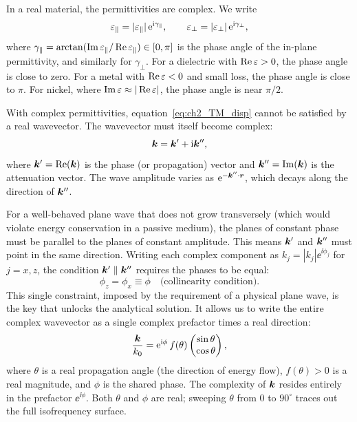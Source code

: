 In a real material, the permittivities are complex. We write
\begin{equation}
  \varepsilon_{\parallel} = |\varepsilon_{\parallel}|\,\mathrm{e}^{\mathrm{i}\gamma_\parallel}, \qquad
  \varepsilon_{\perp} = |\varepsilon_{\perp}|\,\mathrm{e}^{\mathrm{i}\gamma_\perp},
  \label{eq:ch2_polar_eps}
\end{equation}
where $\gamma_\parallel = \arctan(\operatorname{Im}\varepsilon_{\parallel}/\operatorname{Re}\varepsilon_{\parallel}) \in [0,\pi]$ is the
phase angle of the in-plane permittivity, and similarly for $\gamma_\perp$.
For a dielectric with $\operatorname{Re}\varepsilon > 0$, the phase angle is close to zero.
For a metal with $\operatorname{Re}\varepsilon < 0$ and small loss, the phase angle is close to $\pi$.
For nickel, where $\operatorname{Im}\varepsilon \approx |\operatorname{Re}\varepsilon|$, the phase angle is near $\pi/2$.

With complex permittivities, equation~\eqref{eq:ch2_TM_disp} cannot be
satisfied by a real wavevector. The wavevector must itself become complex:
\begin{equation}
  \bm{k} = \bm{k}' + \mathrm{i}\bm{k}'',
  \label{eq:ch2_complex_k}
\end{equation}
where $\bm{k}' = \operatorname{Re}(\bm{k})$ is the phase (or propagation) vector and
$\bm{k}'' = \operatorname{Im}(\bm{k})$ is the attenuation vector. The wave amplitude varies as
$\mathrm{e}^{-\bm{k}''\cdot\bm{r}}$, which decays along the direction of $\bm{k}''$.

For a well-behaved plane wave that does not grow transversely (which would
violate energy conservation in a passive medium), the planes of constant phase
must be parallel to the planes of constant amplitude. This means $\bm{k}'$
and $\bm{k}''$ must point in the same direction. Writing each complex component
as $k_j = |k_j|\ee^{\ii\phi_j}$ for $j = x, z$, the condition
$\bm{k}'\parallel\bm{k}''$ requires the phases to be equal:
\begin{equation}
  \phi_z = \phi_x \equiv \phi \quad \text{(collinearity condition).}
  \label{eq:ch2_collinearity}
\end{equation}
This single constraint, imposed by the requirement of a physical plane wave,
is the key that unlocks the analytical solution. It allows us to write the
entire complex wavevector as a single complex prefactor times a real direction:
\begin{equation}
  \frac{\bm{k}}{k_0} = \mathrm{e}^{\mathrm{i}\phi}\,f(\theta)
  \begin{pmatrix}\sin\theta \\ \cos\theta\end{pmatrix},
  \label{eq:ch2_k_parametric}
\end{equation}
where $\theta$ is a real propagation angle (the direction of energy flow),
$f(\theta) > 0$ is a real magnitude, and $\phi$ is the shared phase. The
complexity of $\bm{k}$ resides entirely in the prefactor $\ee^{\ii\phi}$.
Both $\theta$ and $\phi$ are real; sweeping $\theta$ from $0$ to $90^\circ$
traces out the full isofrequency surface.

